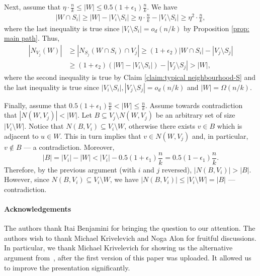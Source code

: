 \documentclass[notitlepage]{scrartcl}
\begin{document}
Next, assume that $\eta \cdot \frac{n}{k} \le |W| \le 0.5(1 + \epsilon_1) \frac{n}{k}$. We have
\begin{align*}        
    |W \cap S_i| \ge |W| - |V_i \setminus S_i| \ge \eta \cdot \frac{n}{k} - |V_i \setminus S_i| \ge \eta^2 \cdot \frac{n}{k},
\end{align*}
where the last inequality is true since $|V_i \setminus S_i| = o_d(n/k)$ by Proposition \ref{prop: main path}. Thus,
\begin{align*}
    |N_{V_j}(W)| &\ge |N_{S_j}(W \cap S_i) \cap V_j| \ge (1 + \epsilon_2) |W \cap S_i| - |V_j \setminus S_j| \\
    &\ge (1 + \epsilon_2)(|W| - |V_i \setminus S_i|) - |V_j \setminus S_j| > |W|,
\end{align*}
where the second inequality is true by Claim \ref{claim:typical neighbourhood-S} and the last inequality is true since $|V_i \setminus S_i|, |V_j \setminus S_j| = o_d(n/k)$ and $|W| = \Omega(n/k)$.

Finally, assume that $0.5(1 + \epsilon_1) \frac{n}{k} < |W| \le \frac{n}{k}$. Assume towards contradiction that $|N(W, V_j)| < |W|$. Let $B \subseteq V_j \setminus N(W, V_j)$ be an arbitrary set of size $|V_i \setminus W|$. Notice that $N(B, V_i) \subseteq V_i \setminus W$, otherwise there exists $v \in B$ which is adjacent to $u \in W$. This in turn implies that $v \in N(W, V_j)$ and, in particular, $v \notin B$ --- a contradiction. Moreover, 
\[
    |B| = |V_i| - |W| < |V_i| - 0.5(1 + \epsilon_1) \frac{n}{k} = 0.5(1-\epsilon_1) \frac{n}{k}.
\]
Therefore, by the previous argument (with $i$ and $j$ reversed), $|N(B, V_i)| > |B|$. However, since $N(B, V_i) \subseteq V_i \setminus W$, we have $|N(B, V_i)| \le |V_i \setminus W| = |B|$ --- contradiction.



\paragraph{Acknowledgements} The authors thank Itai Benjamini for bringing the question to our attention. The authors wish to thank Michael Krivelevich and Noga Alon for fruitful discussions. In particular, we thank Michael Krivelevich for showing us the alternative argument from~\cite{DK}, after the first version of this paper was uploaded. It allowed us to improve the presentation significantly.


    


\end{document}
